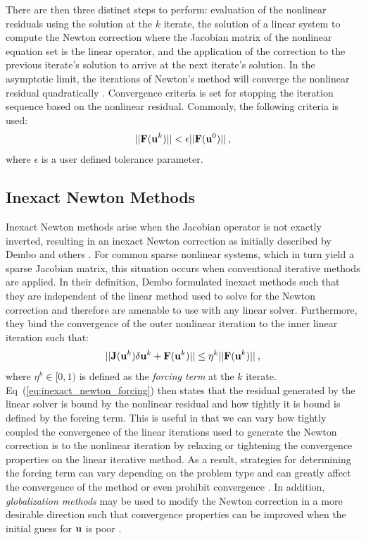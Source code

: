 There are then three distinct steps to perform: evaluation of the
nonlinear residuals using the solution at the $k$ iterate, the
solution of a linear system to compute the Newton correction where the
Jacobian matrix of the nonlinear equation set is the linear operator,
and the application of the correction to the previous iterate's
solution to arrive at the next iterate's solution. In the asymptotic
limit, the iterations of Newton's method will converge the nonlinear
residual quadratically \cite{kelley_iterative_1995}. Convergence
criteria is set for stopping the iteration sequence based on the
nonlinear residual. Commonly, the following criteria is used:
\begin{equation}
  ||\mathbf{F}(\mathbf{u}^{k})|| < \epsilon ||\mathbf{F}(\mathbf{u}^{0})||\:,
  \label{eq:newton_stopping_criteria}
\end{equation}
where $\epsilon$ is a user defined tolerance parameter. 

\subsection{Inexact Newton Methods}
\label{subsec:inexact_newton_methods}
Inexact Newton methods arise when the Jacobian operator is not exactly
inverted, resulting in an inexact Newton correction as initially
described by Dembo and others \cite{dembo_inexact_1982}. For common
sparse nonlinear systems, which in turn yield a sparse Jacobian
matrix, this situation occurs when conventional iterative methods are
applied. In their definition, Dembo formulated inexact methods such
that they are independent of the linear method used to solve for the
Newton correction and therefore are amenable to use with any linear
solver. Furthermore, they bind the convergence of the outer nonlinear
iteration to the inner linear iteration such that:
\begin{equation}
  ||\mathbf{J}(\mathbf{u}^k)\delta \mathbf{u}^k + \mathbf{F}(\mathbf{u}^k)|| \leq \eta^k
  ||\mathbf{F}(\mathbf{u}^k)||\:,
  \label{eq:inexact_newton_forcing}
\end{equation}
where $\eta^k \in [0,1)$ is defined as the \textit{forcing term} at
  the $k$ iterate. Eq~(\ref{eq:inexact_newton_forcing}) then states
  that the residual generated by the linear solver is bound by the
  nonlinear residual and how tightly it is bound is defined by the
  forcing term. This is useful in that we can vary how tightly coupled
  the convergence of the linear iterations used to generate the Newton
  correction is to the nonlinear iteration by relaxing or tightening
  the convergence properties on the linear iterative method. As a
  result, strategies for determining the forcing term can vary
  depending on the problem type and can greatly affect the convergence
  of the method or even prohibit convergence
  \cite{eisenstat_choosing_1996}. In addition, \textit{globalization
    methods} may be used to modify the Newton correction in a more
  desirable direction such that convergence properties can be
  improved when the initial guess for $\mathbf{u}$ is poor
  \cite{pawlowski_globalization_2006}.

